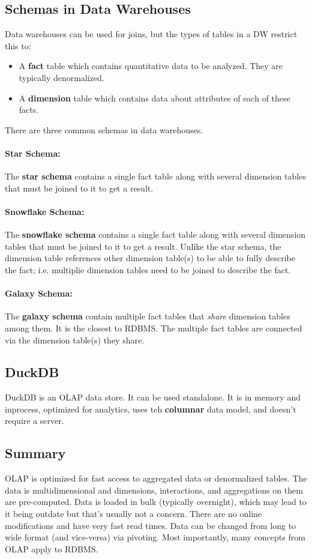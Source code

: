 \documentclass{report}
\renewcommand{\bf}[1]{\textbf{{#1}}}
\renewcommand{\it}[1]{\textit{{#1}}}
\begin{document}
\subsection{Schemas in Data Warehouses}
Data warehouses can be used for joins, but the types of tables in a DW restrict
this to:
\begin{itemize}[label=$\to$]
    \item A \bf{fact} table which contains quantitative data to be analyzed.
        They are typically denormalized.
    \item A \bf{dimension} table which contains data about attributes of each of
        these facts.
\end{itemize}
There are three common schemas in data warehouses.
\paragraph{Star Schema:} The \bf{star schema} contains a single fact table along
with several dimension tables that must be joined to it to get a result.

\paragraph{Snowflake Schema:} The \bf{snowflake schema} contains a single fact
table along with several dimension tables that must be joined to it to get a
result. Unlike the star schema, the dimension table references other dimension
table(s) to be able to fully describe the fact; i.e. multiplie dimension tables
need to be joined to describe the fact.

\paragraph{Galaxy Schema:} The \bf{galaxy schema} contain multiple fact tables
that \it{share} dimension tables among them. It is the closest to RDBMS. The
multiple fact tables are connected via the dimension table(s) they share.


\subsection{DuckDB}
DuckDB is an OLAP data store. It can be used standalone. It is in memory and
inprocess, optimized for analytics, uses teh \bf{columnar} data model, and
doesn't require a server.

\subsection{Summary}
OLAP is optimized for fast access to aggregated data or denormalized tables. The
data is multidimensional and dimensions, interactions, and aggregations on them
are pre-computed. Data is loaded in bulk (typically overnight), which may lead
to it being outdate but that's usually not a concern. There are no online
modifications and have very fast read times. Data can be changed from long to
wide format (and vice-versa) via pivoting. Most importantly, many concepts from
OLAP apply to RDBMS.
\end{document}
